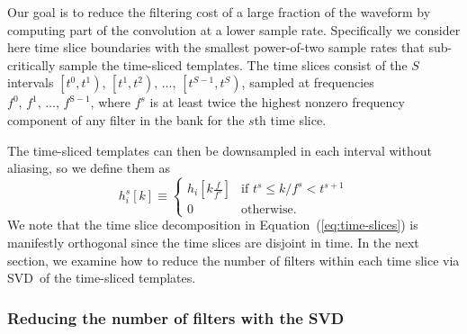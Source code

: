 \documentclass[preprint2]{aastex}
\newcommand{\SVD}{SVD}%
\begin{document}
Our goal is to reduce the filtering cost of a
large fraction of the waveform by computing part of the convolution at a lower
sample rate.  Specifically we consider here time slice boundaries with the
smallest power-of-two sample rates that sub-critically sample the time-sliced
templates.  The time slices consist of the $S$ intervals
$\left[t^0, t^1\right),\, \left[t^1, t^2\right),\, \dots,\, \left[t^{S-1}, t^S\right)$,
sampled at frequencies $f^0,\, f^1,\, \dots,\, f^\mathrm{S-1}$, where $f^s$ is at
least twice the highest nonzero frequency component of any filter in the bank for the
$s$th time slice.

The time-sliced templates can then be downsampled in each interval without
aliasing, so we define them as
%
\begin{equation}
\label{eq:time-sliced-templates}
h_{i}^{s}[k] \equiv
	\begin{cases}
		h_{i}\!\left[k\frac{f}{f^s}\right] & \textrm{if } t^s \leqslant k/f^s < t^{s+1} \\
		0 & \textrm{otherwise.}
	\end{cases}
\end{equation}
%
We note that the time slice decomposition in Equation~(\ref{eq:time-slices}) is
manifestly orthogonal since the time slices are disjoint in time.  In the next
section, we examine how to reduce the number of filters within each time slice
via \SVD\ of the time-sliced templates.

\subsubsection{Reducing the number of filters with the \SVD}
\label{sec:svd}
\end{document}
